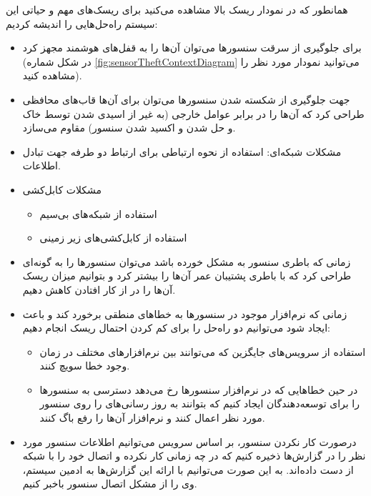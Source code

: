 \documentclass[a4paper]{report}
\begin{document}
همانطور که در نمودار ریسک بالا مشاهده می‌کنید برای ریسک‌های مهم و حیاتی این
سیستم راه‌حل‌هایی را اندیشه کردیم:

\begin{itemize}
    \item برای جلوگیری از سرقت سنسور‌ها می‌توان آن‌ها را به قفل‌های هوشمند مجهز
    کرد (در شکل شماره \ref{fig:sensorTheftContextDiagram} می‌توانید نمودار مورد
    نظر را مشاهده کنید).
    \item جهت جلوگیری از شکسته شدن سنسور‌ها می‌توان برای آن‌ها قاب‌های محافظی
    طراحی کرد که آن‌ها را در برابر عوامل خارجی (به غیر از اسیدی شدن توسط خاک و
    حل شدن و اکسید شدن سنسور) مقاوم می‌سازد.
    \item مشکلات شبکه‌ای: استفاده از نحوه ارتباطی  برای ارتباط دو طرفه
    جهت تبادل اطلاعات.
    \item مشکلات کابل‌کشی
    \begin{itemize}
        \item استفاده از شبکه‌های بی‌سیم
        \item استفاده از کابل‌کشی‌های زیر زمینی
    \end{itemize}
    \item زمانی که باطری سنسور به مشکل خورده باشد می‌توان سنسور‌ها را به گونه‌ای
    طراحی کرد که با باطری پشتیبان عمر آن‌ها را بیشتر کرد و بتوانیم میزان ریسک
    آن‌ها را در از کار افتادن کاهش دهیم.
    \item زمانی که نرم‌افزار موجود در سنسور‌ها به خطا‌های منطقی برخورد کند و
    باعث ایجاد  شود می‌توانیم دو راه‌حل را برای کم کردن احتمال
    ریسک انجام دهیم:
    \begin{itemize}
        \item استفاده از سرویس‌های جایگزین که می‌توانند بین نرم‌افزار‌های مختلف
        در زمان وجود خطا سویچ کنند.
        \item در حین خطا‌هایی که در نرم‌افزار سنسور‌ها رخ می‌دهد دسترسی به
        سنسور‌ها را برای توسعه‌دهندگان ایجاد کنیم که بتوانند به روز رسانی‌های
         را روی سنسور مورد نظر اعمال کنند و نرم‌افزار آن‌ها را
        رفع باگ کنند.
    \end{itemize}
    \item درصورت کار نکردن سنسور، بر اساس سرویس  می‌توانیم
    اطلاعات سنسور مورد نظر را در گزارش‌ها ذخیره کنیم که در چه زمانی کار نکرده و
    اتصال خود را با شبکه از دست داده‌اند. به این صورت می‌توانیم با ارائه این
    گزارش‌ها به ادمین سیستم، وی را از مشکل اتصال سنسور باخبر کنیم.
\end{itemize}
\end{document}
